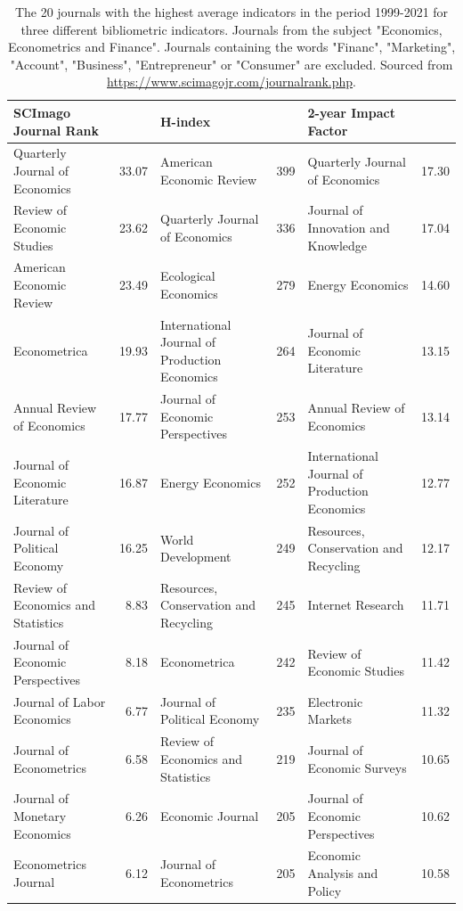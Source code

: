 \begin{table}[p]
\caption[Bibliometrics indicator for top journals]{The 20 journals with the highest average indicators in the period 1999-2021 for three different bibliometric indicators. Journals from the subject "Economics, Econometrics and Finance". Journals containing the words "Financ", "Marketing", "Account", "Business", "Entrepreneur" or "Consumer" are excluded. Sourced from \url{https://www.scimagojr.com/journalrank.php}.}
\label{tab:IF}
\begin{tabularx}{\hsize}{@{}Yr|Yr|Yr@{}}
\toprule
SCImago Journal Rank &  & H-index &  & 2-year Impact Factor &  \\
\midrule
Quarterly Journal of Economics & 33.07 & American Economic Review & 399 & Quarterly Journal of Economics & 17.30 \\
Review of Economic Studies & 23.62 & Quarterly Journal of Economics & 336 & Journal of Innovation and Knowledge & 17.04 \\
American Economic Review & 23.49 & Ecological Economics & 279 & Energy Economics & 14.60 \\
Econometrica & 19.93 & International Journal of Production Economics & 264 & Journal of Economic Literature & 13.15 \\
Annual Review of Economics & 17.77 & Journal of Economic Perspectives & 253 & Annual Review of Economics & 13.14 \\
Journal of Economic Literature & 16.87 & Energy Economics & 252 & International Journal of Production Economics & 12.77 \\
Journal of Political Economy & 16.25 & World Development & 249 & Resources, Conservation and Recycling & 12.17 \\
Review of Economics and Statistics & 8.83 & Resources, Conservation and Recycling & 245 & Internet Research & 11.71 \\
Journal of Economic Perspectives & 8.18 & Econometrica & 242 & Review of Economic Studies & 11.42 \\
Journal of Labor Economics & 6.77 & Journal of Political Economy & 235 & Electronic Markets & 11.32 \\
Journal of Econometrics & 6.58 & Review of Economics and Statistics & 219 & Journal of Economic Surveys & 10.65 \\
Journal of Monetary Economics & 6.26 & Economic Journal & 205 & Journal of Economic Perspectives & 10.62 \\
Econometrics Journal & 6.12 & Journal of Econometrics & 205 & Economic Analysis and Policy & 10.58 \\

\end{tabularx}
\end{table}
